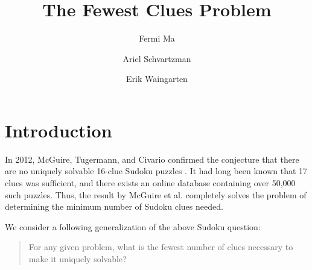 \documentclass[runningheads,a4paper]{llncs}
\begin{document}
\mainmatter  %

\title{The Fewest Clues Problem}


%
%
\author{Fermi Ma \and Ariel Schvartzman \and Erik Waingarten}
%


%
%

\maketitle

\section{Introduction}
\label{sec:introduction}

In 2012, McGuire, Tugermann, and Civario confirmed the conjecture that there are no uniquely solvable 16-clue Sudoku puzzles \cite{mcguire2012there}. It had long been known that 17 clues was sufficient, and there exists an online database containing over 50,000 such puzzles. Thus, the result by McGuire et al. completely solves the problem of determining the minimum number of Sudoku clues needed.

We consider a following generalization of the above Sudoku question: 
\begin{quote}
For any given problem, what is the fewest number of clues necessary to make it uniquely solvable?
\end{quote}
\end{document}
